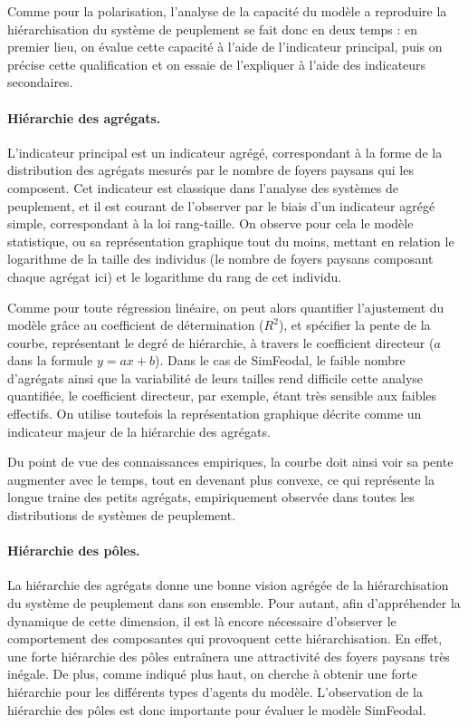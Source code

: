 Comme pour la polarisation, l'analyse de la capacité du modèle a reproduire la hiérarchisation du système de peuplement se fait donc en deux temps :
en premier lieu, on évalue cette capacité à l'aide de l'indicateur principal, puis on précise cette qualification et on essaie de l'expliquer à l'aide des indicateurs secondaires.

\paragraph{Hiérarchie des agrégats.}

L'indicateur principal est un indicateur agrégé, correspondant à la forme de la distribution des agrégats mesurés par le nombre de foyers paysans qui les composent.
Cet indicateur est classique dans l'analyse des systèmes de peuplement, et il est courant de l'observer par le biais d'un indicateur agrégé simple, correspondant à la loi rang-taille.
On observe pour cela le modèle statistique, ou sa représentation graphique tout du moins, mettant en relation le logarithme de la taille des individus (le nombre de foyers paysans composant chaque agrégat ici) et le logarithme du rang de cet individu.

Comme pour toute régression linéaire, on peut alors quantifier l'ajustement du modèle grâce au coefficient de détermination ($R^2$), et spécifier la pente de la courbe, représentant le degré de hiérarchie, à travers le coefficient directeur ($a$ dans la formule $y = ax + b$).
Dans le cas de SimFeodal, le faible nombre d'agrégats ainsi que la variabilité de leurs tailles rend difficile cette analyse quantifiée, le coefficient directeur, par exemple, étant très sensible aux faibles effectifs.
On utilise toutefois la représentation graphique décrite comme un indicateur majeur de la hiérarchie des agrégats.

Du point de vue des connaissances empiriques, la courbe doit ainsi voir sa pente augmenter avec le temps, tout en devenant plus convexe, ce qui représente la \og longue traine\fg{} des petits agrégats, empiriquement observée dans toutes les distributions de systèmes de peuplement.

\paragraph{Hiérarchie des pôles.}

La hiérarchie des agrégats donne une bonne vision agrégée de la hiérarchisation du système de peuplement dans son ensemble.
Pour autant, afin d'appréhender la dynamique de cette dimension, il est là encore nécessaire d'observer le comportement des composantes qui provoquent cette hiérarchisation.
En effet, une forte hiérarchie des pôles entraînera une attractivité des foyers paysans très inégale.
De plus, comme indiqué plus haut, on cherche à obtenir une forte hiérarchie pour les différents types d'agents du modèle.
L'observation de la hiérarchie des pôles est donc importante pour évaluer le modèle SimFeodal.

